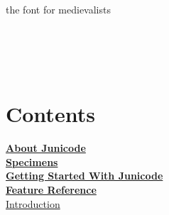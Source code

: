 \documentclass[12pt,letterpaper,openany]{book}
\newcounter{Feature}
\begin{document}
\begin{titlepage}
\huge\noindent
{\color{myRed}}\\[5cm]
\Huge {} \\[1cm]
\huge \centering the font for medievalists \\[1cm]
 \Huge{} \\[1cm]
 \huge{} \\[1ex]
 \Large{}\\
\vfill
{\color{myRed}}
\end{titlepage}
\mainmatter

\chapter*{\color{RViolet}Contents}
\thispagestyle{plain}

\noindent\hyperlink{aboutj}{\bfseries\large About Junicode}\\[-0.25em]

\noindent\hyperlink{specimens}{\bfseries\large Specimens}\\[-0.25em]

\noindent\hyperlink{GettingStarted}{\bfseries\large Getting Started With Junicode}\\[-0.25em]

\noindent\hyperlink{FeatureReference}{\bfseries\large Feature Reference}\\[-0.25em]

\hyperlink{intro}{Introduction}
\end{document}
